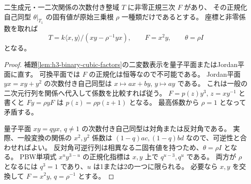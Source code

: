 \begin{lemma}\label{lem:h3-binary-normalizer-mu3}
二生成元・一二次関係の次数付き整域 $T$ に非零正規三次 $F$ があり、
その正規化自己同型 $\theta|_{T_1}$ の固有値が原始三乗根 $\rho$ 一種類だけであるとする。
座標と非零係数を取れば
\[
 T=k\langle x,y\rangle/(xy-\rho^{-1}yx),\qquad
 F=x^2y,\qquad \theta=\rho I
\]
となる。
\end{lemma}
\begin{proof}
補題\ref{lem:h3-binary-cubic-factors}の二変数表示を量子平面またはJordan平面に直す。
可換平面では $F$ の正規化は恒等なので不可能である。
Jordan平面 $yx=xy+y^2$ の次数付き自己同型は
$x\mapsto ax+by$, $y\mapsto ay$ である。
これは一般の二次元行列を関係へ代入して係数を比較すれば従う。
$F=p(z)y^3$, $z=xy^{-1}$ と書くと
$Fy=\rho yF$ は $p(z)=\rho p(z+1)$ となる。
最高係数から $\rho=1$ となって矛盾する。

量子平面 $xy=qyx$, $q\ne1$ の次数付き自己同型は対角または反対角である。
実際、一般変換の関係の $x^2,y^2$ 係数は
$(1-q)ac,(1-q)bd$ なので、可逆性と合わせればよい。
反対角可逆行列は相異なる二固有値を持つため、$\theta=\rho I$ となる。
PBW単項式 $x^uy^{3-u}$ の正規化指標は $x,y$ 上で
$q^{u-3},q^u$ である。
両方が $\rho$ となるには $q^3=1$ であり、$u$ は1または2の一つに限られる。
必要なら $x,y$ を交換して $F=x^2y$, $q=\rho^{-1}$ とする。
\end{proof}

